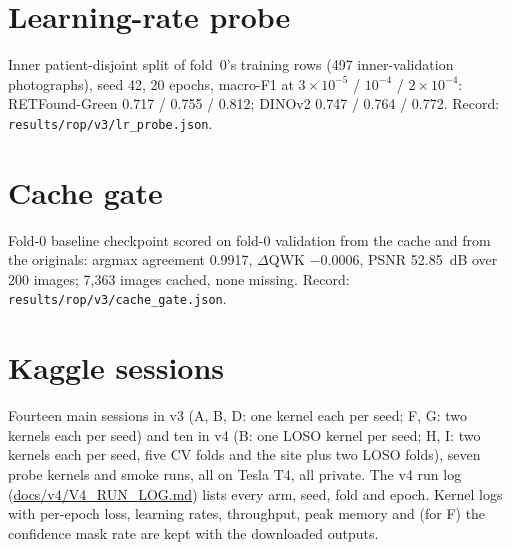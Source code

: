 \section*{Learning-rate probe}
Inner patient-disjoint split of fold~0's training rows (497 inner-validation photographs), seed 42, 20 epochs, macro-F1 at $3\times10^{-5}$ / $10^{-4}$ / $2\times10^{-4}$: RETFound-Green 0.717 / 0.755 / 0.812; DINOv2 0.747 / 0.764 / 0.772. Record: \texttt{results/rop/v3/lr\_probe.json}.
\section*{Cache gate}
Fold-0 baseline checkpoint scored on fold-0 validation from the cache and from the originals: argmax agreement 0.9917, $\Delta$QWK $-0.0006$, PSNR 52.85~dB over 200 images; 7{,}363 images cached, none missing. Record: \texttt{results/rop/v3/cache\_gate.json}.
\section*{Kaggle sessions}
Fourteen main sessions in v3 (A, B, D: one kernel each per seed; F, G: two kernels each per seed) and ten in v4 (B: one LOSO kernel per seed; H, I: two kernels each per seed, five CV folds and the site plus two LOSO folds), seven probe kernels and smoke runs, all on Tesla T4, all private. The v4 run log (\url{docs/v4/V4_RUN_LOG.md}) lists every arm, seed, fold and epoch. Kernel logs with per-epoch loss, learning rates, throughput, peak memory and (for F) the confidence mask rate are kept with the downloaded outputs.

